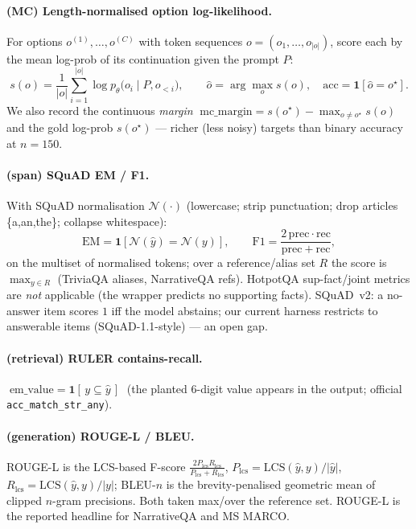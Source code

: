 \documentclass[11pt]{article}
\newcommand{\code}[1]{\texttt{#1}}
\begin{document}
\paragraph{(MC) Length-normalised option log-likelihood.}
For options $o^{(1)},\dots,o^{(C)}$ with token sequences
$o=(o_1,\dots,o_{|o|})$, score each by the mean log-prob of its
continuation given the prompt $P$:
\begin{equation}
s(o)=\frac{1}{|o|}\sum_{i=1}^{|o|}\log p_\theta\!\big(o_i\mid P,o_{<i}\big),
\qquad
\widehat{o}=\arg\max_o s(o),\quad
\mathrm{acc}=\mathbf{1}[\widehat{o}=o^\star].
\end{equation}
We also record the continuous \emph{margin}
$\;\mathrm{mc\_margin}=s(o^\star)-\max_{o\ne o^\star}s(o)\;$ and the
gold log-prob $s(o^\star)$ --- richer (less noisy) targets than binary
accuracy at $n{=}150$.

\paragraph{(span) SQuAD EM / F1.} With SQuAD normalisation
$\mathcal{N}(\cdot)$ (lowercase; strip punctuation; drop articles
\{a,an,the\}; collapse whitespace):
\begin{equation}
\mathrm{EM}=\mathbf{1}[\mathcal{N}(\hat y)=\mathcal{N}(y)],\qquad
\mathrm{F1}=\frac{2\,\mathrm{prec}\cdot\mathrm{rec}}{\mathrm{prec}+\mathrm{rec}},
\end{equation}
on the multiset of normalised tokens; over a reference/alias set $R$ the
score is $\max_{y\in R}$ (TriviaQA aliases, NarrativeQA refs). HotpotQA
sup-fact/joint metrics are \emph{not} applicable (the wrapper predicts
no supporting facts). SQuAD~v2: a no-answer item scores $1$ iff the model
abstains; our current harness restricts to answerable items
(SQuAD-1.1-style) --- an open gap.

\paragraph{(retrieval) RULER contains-recall.}
$\;\mathrm{em\_value}=\mathbf{1}[\,y \subseteq \hat y\,]\;$ (the planted
6-digit value appears in the output; official \code{acc\_match\_str\_any}).

\paragraph{(generation) ROUGE-L / BLEU.} ROUGE-L is the LCS-based F-score
$\tfrac{2 P_{\mathrm{lcs}}R_{\mathrm{lcs}}}{P_{\mathrm{lcs}}+R_{\mathrm{lcs}}}$,
$P_{\mathrm{lcs}}=\mathrm{LCS}(\hat y,y)/|\hat y|$,
$R_{\mathrm{lcs}}=\mathrm{LCS}(\hat y,y)/|y|$; BLEU-$n$ is the
brevity-penalised geometric mean of clipped $n$-gram precisions. Both
taken max/over the reference set. ROUGE-L is the reported headline for
NarrativeQA and MS MARCO.
\end{document}
